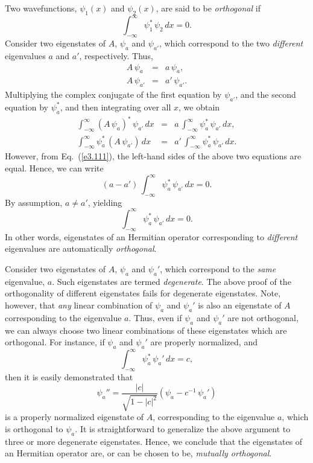 Two wavefunctions, $\psi_1(x)$ and $\psi_2(x)$, are said to be {\em orthogonal}\/
if
\begin{equation}
\int_{-\infty}^{\infty}\psi_1^\ast\,\psi_2\,dx = 0.
\end{equation}
Consider two eigenstates of $A$, $\psi_a$ and $\psi_{a'}$, which
correspond to the two {\em different}\/ eigenvalues $a$ and $a'$, respectively. Thus,
\begin{eqnarray}
A\,\psi_a&=& a\,\psi_a,\\[0.5ex]
A\,\psi_{a'}&=& a'\,\psi_{a'}.
\end{eqnarray}
Multiplying the complex conjugate of the first equation by $\psi_{a'}$,
and the second equation by $\psi_a^\ast$, and then integrating over all
$x$, we obtain
\begin{eqnarray}
\int_{-\infty}^\infty (A\,\psi_a)^\ast\,\psi_{a'}\,dx&=& a\,\int_{-\infty}^\infty\psi_a^\ast\,\psi_{a'}\,dx,\\[0.5ex]
\int_{-\infty}^\infty \psi_a^\ast\,(A\,\psi_{a'})\,dx&=& a'\,\int_{-\infty}^{\infty}\psi_a^\ast\,\psi_{a'}\,dx.
\end{eqnarray}
However, from Eq.~(\ref{e3.111}), the left-hand sides of the above two
equations are equal. Hence, we can
write
\begin{equation}
(a-a')\, \int_{-\infty}^\infty\psi_a^\ast\,\psi_{a'}\,dx = 0.
\end{equation}
By assumption, $a\neq a'$, yielding
\begin{equation}
\int_{-\infty}^\infty\psi_a^\ast\,\psi_{a'}\,dx = 0.
\end{equation} 
In other words, eigenstates of an Hermitian operator corresponding to
{\em different}\/ eigenvalues are automatically {\em orthogonal}.

Consider two eigenstates of $A$, $\psi_a$ and $\psi_a'$, which
correspond to the {\em same}\/ eigenvalue, $a$. Such eigenstates
are termed {\em degenerate}. The above proof of the orthogonality
of different eigenstates fails for degenerate eigenstates. 
Note, however, that {\em any}\/ linear combination of
$\psi_a$ and $\psi_a'$ is also an eigenstate of $A$ corresponding
to the eigenvalue $a$. Thus, even if $\psi_a$ and $\psi_a'$ are not
orthogonal, we can always choose two linear combinations
of these eigenstates which are orthogonal. For instance,
if $\psi_a$ and $\psi_a'$ are properly normalized, and
\begin{equation}
\int_{-\infty}^\infty \psi_a^\ast\,\psi_a'\,dx = c,
\end{equation}
then it is easily demonstrated that
\begin{equation}
\psi_a'' = \frac{|c|}{\sqrt{1-|c|^2}}\left(\psi_a - c^{-1}\,\psi_a'\right)
\end{equation}
is a properly normalized eigenstate of $A$, corresponding to the
eigenvalue $a$, which is orthogonal to $\psi_a$. It is straightforward
to generalize the above argument to three or more degenerate eigenstates.
Hence, we conclude that the eigenstates of an Hermitian
operator are, or can be chosen to be, {\em mutually orthogonal}.

